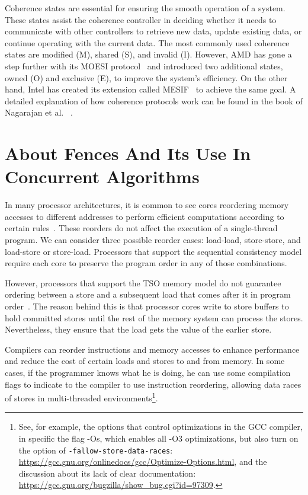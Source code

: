 Coherence states are essential for ensuring the smooth operation of a system. These states assist the coherence controller in deciding whether it needs to communicate with other controllers to retrieve new data, update existing data, or continue operating with the current data. The most commonly used coherence states are modified (M), shared (S), and invalid (I). However, AMD has gone a step further with its MOESI protocol~\cite{devices_amd64} and introduced two additional states, owned (O) and exclusive (E), to improve the system's efficiency. On the other hand, Intel has created its extension called MESIF~\cite{guideintel} to achieve the same goal. A detailed explanation of how coherence protocols work can be found in the book of Nagarajan et al. ~\cite{DBLP_series_synthesis_2020Nagarajan}.

\section{About Fences And Its Use In Concurrent Algorithms}

In many processor architectures, it is common to see cores reordering memory accesses to different addresses to perform efficient computations according to certain rules~\cite{DBLP_series_synthesis_2020Nagarajan}. These reorders do not affect the execution of a single-thread program. We can consider three possible reorder cases: load-load, store-store, and load-store or store-load. Processors that support the sequential consistency model require each core to preserve the program order in any of those combinations.

However, processors that support the TSO memory model do not guarantee ordering between a store and a subsequent load that comes after it in program order~\cite{DBLP_conf_tphol_OwensSS09, DBLP_journals_cacm_SewellSONM10}. The reason behind this is that processor cores write to store buffers to hold committed stores until the rest of the memory system can process the stores. Nevertheless, they ensure that the load gets the value of the earlier store.

Compilers can reorder instructions and memory accesses to enhance performance and reduce the cost of certain loads and stores to and from memory. In some cases, if the programmer knows what he is doing, he can use some compilation flags to indicate to the compiler to use instruction reordering, allowing data races of stores in multi-threaded environments\footnote{See, for example, the options that control optimizations in the GCC compiler, in specific the flag -Os, which enables all -O3 optimizations, but also turn on the option of \texttt{-fallow-store-data-races}: \url{https://gcc.gnu.org/onlinedocs/gcc/Optimize-Options.html}, and the discussion about its lack of clear documentation: \url{https://gcc.gnu.org/bugzilla/show_bug.cgi?id=97309}.}.

